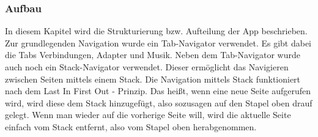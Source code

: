 \documentclass[]{article}
\begin{document}
\subsubsection{Aufbau}
In diesem Kapitel wird die Strukturierung bzw. Aufteilung der App beschrieben. Zur grundlegenden Navigation wurde ein Tab-Navigator verwendet. Es gibt dabei die Tabs Verbindungen, Adapter und Musik. Neben dem Tab-Navigator wurde auch noch ein Stack-Navigator verwendet. Dieser ermöglicht das Navigieren zwischen Seiten mittels einem Stack. Die Navigation mittels Stack funktioniert nach dem Last In First Out - Prinzip.  Das heißt, wenn eine neue Seite aufgerufen wird, wird diese dem Stack hinzugefügt, also sozusagen auf den Stapel oben drauf gelegt. Wenn man wieder auf die vorherige Seite will, wird die aktuelle Seite einfach vom Stack entfernt, also vom Stapel oben herabgenommen. 
\end{document}
